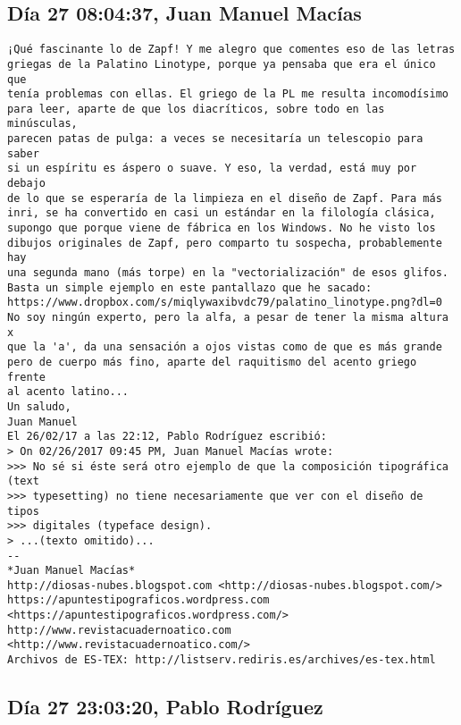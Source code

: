 \documentclass[a4paper,10pt]{article}
\begin{document}
\subsection{Día 27 08:04:37, Juan Manuel Macías}

\begin{lstlisting}
¡Qué fascinante lo de Zapf! Y me alegro que comentes eso de las letras 
griegas de la Palatino Linotype, porque ya pensaba que era el único que 
tenía problemas con ellas. El griego de la PL me resulta incomodísimo 
para leer, aparte de que los diacríticos, sobre todo en las minúsculas, 
parecen patas de pulga: a veces se necesitaría un telescopio para saber 
si un espíritu es áspero o suave. Y eso, la verdad, está muy por debajo 
de lo que se esperaría de la limpieza en el diseño de Zapf. Para más 
inri, se ha convertido en casi un estándar en la filología clásica, 
supongo que porque viene de fábrica en los Windows. No he visto los 
dibujos originales de Zapf, pero comparto tu sospecha, probablemente hay 
una segunda mano (más torpe) en la "vectorialización" de esos glifos. 
Basta un simple ejemplo en este pantallazo que he sacado: 
https://www.dropbox.com/s/miqlywaxibvdc79/palatino_linotype.png?dl=0
No soy ningún experto, pero la alfa, a pesar de tener la misma altura x 
que la 'a', da una sensación a ojos vistas como de que es más grande 
pero de cuerpo más fino, aparte del raquitismo del acento griego frente 
al acento latino...
Un saludo,
Juan Manuel
El 26/02/17 a las 22:12, Pablo Rodríguez escribió:
> On 02/26/2017 09:45 PM, Juan Manuel Macías wrote:
>>> No sé si éste será otro ejemplo de que la composición tipográfica (text
>>> typesetting) no tiene necesariamente que ver con el diseño de tipos
>>> digitales (typeface design).
> ...(texto omitido)...
-- 
*Juan Manuel Macías*
http://diosas-nubes.blogspot.com <http://diosas-nubes.blogspot.com/>
https://apuntestipograficos.wordpress.com 
<https://apuntestipograficos.wordpress.com/>
http://www.revistacuadernoatico.com <http://www.revistacuadernoatico.com/>
Archivos de ES-TEX: http://listserv.rediris.es/archives/es-tex.html

\end{lstlisting}

\subsection{Día 27 23:03:20, Pablo Rodríguez}
\end{document}
